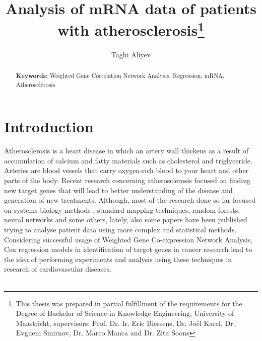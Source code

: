 \documentclass{ba-kecs}
\numberwithin{figure}{section}
\numberwithin{equation}{section}
\begin{document}
\title{Analysis of mRNA data of patients with atherosclerosis\footnote{This thesis was prepared in partial fulfillment of the requirements
 for the Degree of Bachelor of Science in Knowledge Engineering,
University of Maastricht,  supervisors: Prof. Dr. Ir. Eric Biessens, Dr. Jo\"{e}l Karel, Dr. Evgueni Smirnov, Dr. Marco Manca and Dr. Zita Soons}}
\author{Taghi Aliyev \\}
\maketitle

\makeatletter
\let\ps@oldempty\ps@empty %
\renewcommand\ps@empty\ps@plain
\makeatother


\begin{abstract}

\smallskip
\noindent \textbf{Keywords: } Weighted Gene Correlation Network Analysis, Regression, mRNA, Atherosclerosis
\end{abstract}


\section{Introduction}
Atherosclerosis is a heart disease in which an artery wall thickens as a result of accumulation of calcium and fatty materials such as cholesterol and triglyceride. Arteries are blood vessels that carry oxygen-rich blood to your heart and other parts of the body. Recent research concerning atherosclerosis focused on finding new target genes that will lead to better understanding of the disease and generation of new treatments. Although, most of the research done so far focused on systems biology methods \cite{systems}, standard mapping techniques, random forests, neural networks and some others, lately, also some papers have been published trying to analyse patient data using more complex and statistical methods. Considering successful usage of Weighted Gene Co-expression Network Analysis, Cox regression models in identification of target genes in cancer research\cite{wgcna2,cox2,netcox} lead to the idea of performing experiments and analysis using these techniques in research of cardiovascular diseases.\\ \\
\end{document}
